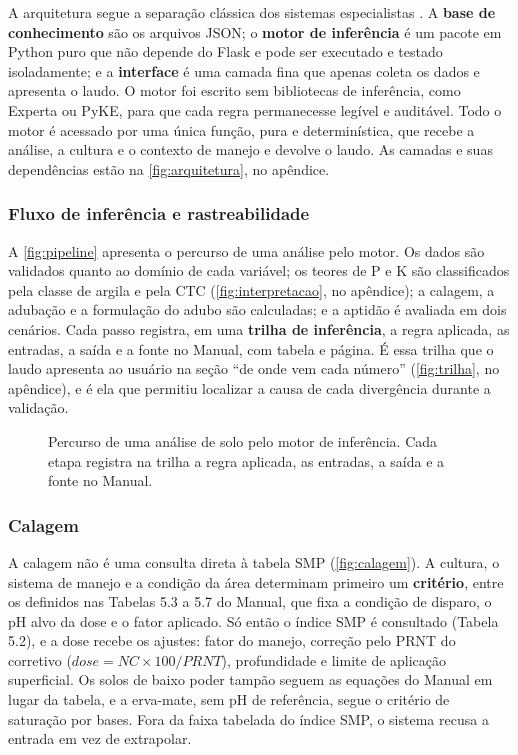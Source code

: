 A arquitetura segue a separação clássica dos sistemas especialistas
\citep{Mendes1997, Lanzer2009}. A \textbf{base de conhecimento} são os arquivos JSON; o
\textbf{motor de inferência} é um pacote em Python puro que não depende do Flask e pode ser
executado e testado isoladamente; e a \textbf{interface} é uma camada fina que apenas coleta os
dados e apresenta o laudo. O motor foi escrito sem bibliotecas de inferência, como Experta ou
PyKE, para que cada regra permanecesse legível e auditável. Todo o motor é acessado por uma
única função, pura e determinística, que recebe a análise, a cultura e o contexto de manejo e
devolve o laudo. As camadas e suas dependências estão na \autoref{fig:arquitetura}, no
apêndice.

\subsubsection{Fluxo de inferência e rastreabilidade}

A \autoref{fig:pipeline} apresenta o percurso de uma análise pelo motor. Os dados são validados
quanto ao domínio de cada variável; os teores de P e K são classificados pela classe de argila e
pela CTC (\autoref{fig:interpretacao}, no apêndice); a calagem, a adubação e a formulação do adubo são calculadas; e a aptidão é avaliada
em dois cenários. Cada passo registra, em uma \textbf{trilha de inferência}, a regra aplicada,
as entradas, a saída e a fonte no Manual, com tabela e página. É essa trilha que o laudo
apresenta ao usuário na seção ``de onde vem cada número'' (\autoref{fig:trilha}, no apêndice), e é ela que
permitiu localizar a causa de cada divergência durante a validação.

\begin{figure}[!tbp]
\centering
{}
\caption{Percurso de uma análise de solo pelo motor de inferência. Cada etapa registra na
trilha a regra aplicada, as entradas, a saída e a fonte no Manual.}
\label{fig:pipeline}
\end{figure}

\subsubsection{Calagem}

A calagem não é uma consulta direta à tabela SMP (\autoref{fig:calagem}). A cultura, o sistema
de manejo e a condição da área determinam primeiro um \textbf{critério}, entre os definidos nas
Tabelas 5.3 a 5.7 do Manual, que fixa a condição de disparo, o pH alvo da dose e o fator
aplicado. Só então o índice SMP é consultado (Tabela 5.2), e a dose recebe os ajustes: fator do
manejo, correção pelo PRNT do corretivo ($\mathit{dose} = \mathit{NC} \times 100 /
\mathit{PRNT}$), profundidade e limite de aplicação superficial. Os solos de baixo poder tampão
seguem as equações do Manual em lugar da tabela, e a erva-mate, sem pH de referência, segue o
critério de saturação por bases. Fora da faixa tabelada do índice SMP, o sistema recusa a
entrada em vez de extrapolar.

